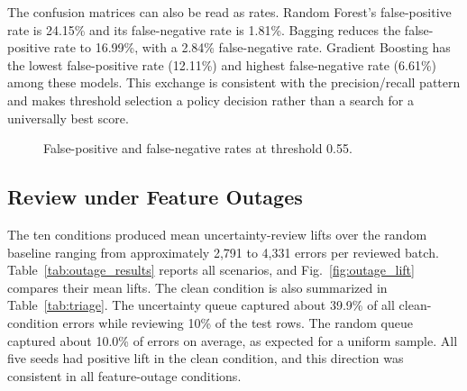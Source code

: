 \documentclass[conference]{IEEEtran}
\begin{document}
The confusion matrices can also be read as rates. Random Forest's false-positive rate is 24.15\% and its false-negative rate is 1.81\%. Bagging reduces the false-positive rate to 16.99\%, with a 2.84\% false-negative rate. Gradient Boosting has the lowest false-positive rate (12.11\%) and highest false-negative rate (6.61\%) among these models. This exchange is consistent with the precision/recall pattern and makes threshold selection a policy decision rather than a search for a universally best score.

\begin{figure}[t]
\centering
{}
\caption{False-positive and false-negative rates at threshold 0.55.}
\label{fig:error_rates}
\end{figure}

\subsection{Review under Feature Outages}
The ten conditions produced mean uncertainty-review lifts over the random baseline ranging from approximately 2,791 to 4,331 errors per reviewed batch. Table~\ref{tab:outage_results} reports all scenarios, and Fig.~\ref{fig:outage_lift} compares their mean lifts. The clean condition is also summarized in Table~\ref{tab:triage}. The uncertainty queue captured about 39.9\% of all clean-condition errors while reviewing 10\% of the test rows. The random queue captured about 10.0\% of errors on average, as expected for a uniform sample. All five seeds had positive lift in the clean condition, and this direction was consistent in all feature-outage conditions.
\end{document}
